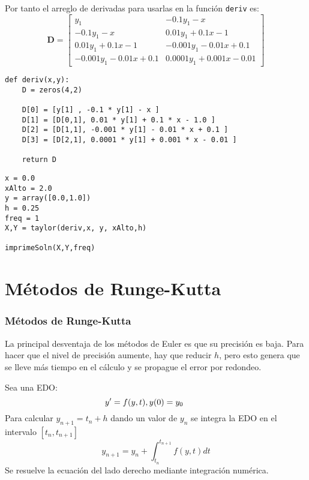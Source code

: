 \begin{frame}
Por tanto el arreglo de derivadas para usarlas en la función \texttt{deriv} es:
\fontsize{10}{10}\selectfont
\[ \mathbf{D} =
\begin{bmatrix}
y_{1} & -0.1 y_{1} - x \\
-0.1 y_{1} - x & 0.01 y_{1} + 0.1x -1 \\
0.01 y_{1} + 0.1 x -1 & -0.001 y_{1}-0.01 x + 0.1 \\
-0.001 y_{1} - 0.01x + 0.1 & 0.0001y_{1} + 0.001x-0.01
\end{bmatrix} \]
\end{frame}
\begin{frame}[fragile]
\begin{lstlisting}
def deriv(x,y):
    D = zeros(4,2)
    
    D[0] = [y[1] , -0.1 * y[1] - x ]
    D[1] = [D[0,1], 0.01 * y[1] + 0.1 * x - 1.0 ]
    D[2] = [D[1,1], -0.001 * y[1] - 0.01 * x + 0.1 ]
    D[3] = [D[2,1], 0.0001 * y[1] + 0.001 * x - 0.01 ]
    
    return D
\end{lstlisting}
\end{frame}
\begin{frame}[fragile]
\begin{lstlisting}
x = 0.0
xAlto = 2.0
y = array([0.0,1.0])
h = 0.25
freq = 1
X,Y = taylor(deriv,x, y, xAlto,h)

imprimeSoln(X,Y,freq)
\end{lstlisting}

\end{frame}
\section{Métodos de Runge-Kutta}
\begin{frame}
\frametitle{Métodos de Runge-Kutta}
La principal desventaja de los métodos de Euler es que su precisión es baja. Para hacer que el nivel de precisión aumente, hay que reducir $h$, pero esto genera que se lleve más tiempo en el cálculo y se propague el error por redondeo.
\end{frame}
\begin{frame}
Sea una EDO:
\[y' =  f(y,t), \hspace{1cm y(0)= y_{0}}\]
Para calcular $y_{n+1} = t_{n} + h$ dando un valor de $y_{n}$ se integra la EDO en el intervalo $[t_{n}, t_{n+1}]$
\[y_{n+1} = y_{n} + \int_{t_{n}}^{t_{n+1}} f(y,t) dt\]
Se resuelve la ecuación del lado derecho mediante integración numérica.
\end{frame}
